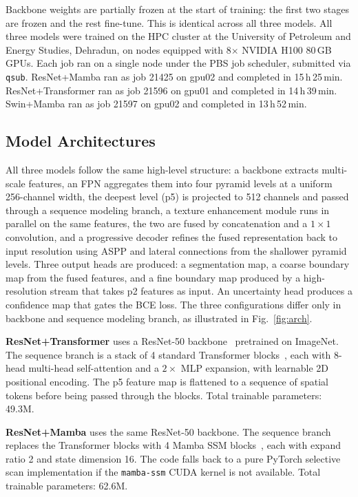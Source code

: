 \documentclass[10pt,conference]{IEEEtran}
\begin{document}
Backbone weights are partially frozen at the start of training: the first two stages are frozen and the rest fine-tune. This is identical across all three models. All three models were trained on the HPC cluster at the University of Petroleum and Energy Studies, Dehradun, on nodes equipped with 8${\times}$ NVIDIA H100 80\,GB GPUs. Each job ran on a single node under the PBS job scheduler, submitted via \texttt{qsub}. ResNet+Mamba ran as job 21425 on gpu02 and completed in 15\,h\,25\,min. ResNet+Transformer ran as job 21596 on gpu01 and completed in 14\,h\,39\,min. Swin+Mamba ran as job 21597 on gpu02 and completed in 13\,h\,52\,min.

\subsection{Model Architectures}

All three models follow the same high-level structure: a backbone extracts multi-scale features, an FPN aggregates them into four pyramid levels at a uniform 256-channel width, the deepest level (p5) is projected to 512 channels and passed through a sequence modeling branch, a texture enhancement module runs in parallel on the same features, the two are fused by concatenation and a $1{\times}1$ convolution, and a progressive decoder refines the fused representation back to input resolution using ASPP and lateral connections from the shallower pyramid levels. Three output heads are produced: a segmentation map, a coarse boundary map from the fused features, and a fine boundary map produced by a high-resolution stream that takes p2 features as input. An uncertainty head produces a confidence map that gates the BCE loss. The three configurations differ only in backbone and sequence modeling branch, as illustrated in Fig.~\ref{fig:arch}.

\textbf{ResNet+Transformer} uses a ResNet-50 backbone~\cite{he2016resnet} pretrained on ImageNet. The sequence branch is a stack of 4 standard Transformer blocks~\cite{liu2021swin}, each with 8-head multi-head self-attention and a $2{\times}$ MLP expansion, with learnable 2D positional encoding. The p5 feature map is flattened to a sequence of spatial tokens before being passed through the blocks. Total trainable parameters: 49.3M.

\textbf{ResNet+Mamba} uses the same ResNet-50 backbone. The sequence branch replaces the Transformer blocks with 4 Mamba SSM blocks~\cite{gu2023mamba}, each with expand ratio 2 and state dimension 16. The code falls back to a pure PyTorch selective scan implementation if the \texttt{mamba-ssm} CUDA kernel is not available. Total trainable parameters: 62.6M.
\end{document}
